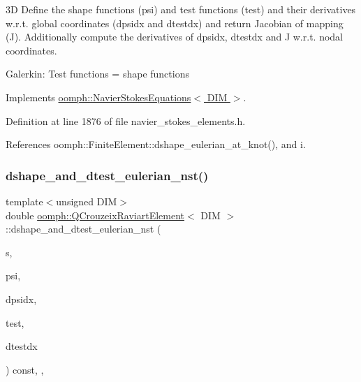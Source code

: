 3D Define the shape functions (psi) and test functions (test) and their derivatives w.\+r.\+t. global coordinates (dpsidx and dtestdx) and return Jacobian of mapping (J). Additionally compute the derivatives of dpsidx, dtestdx and J w.\+r.\+t. nodal coordinates.

Galerkin\+: Test functions = shape functions 

Implements \hyperlink{classoomph_1_1NavierStokesEquations_afbc63afd804f5143c74b0ca1be76ef82}{oomph\+::\+Navier\+Stokes\+Equations$<$ D\+I\+M $>$}.



Definition at line 1876 of file navier\+\_\+stokes\+\_\+elements.\+h.



References oomph\+::\+Finite\+Element\+::dshape\+\_\+eulerian\+\_\+at\+\_\+knot(), and i.

\mbox{\label{classoomph_1_1QCrouzeixRaviartElement_af1553d79bb5f49fd21f695d468ea59d4}} 
\subsubsection{\texorpdfstring{dshape\+\_\+and\+\_\+dtest\+\_\+eulerian\+\_\+nst()}{dshape\_and\_dtest\_eulerian\_nst()}}
{\footnotesize\ttfamily template$<$unsigned D\+IM$>$ \\
double \hyperlink{classoomph_1_1QCrouzeixRaviartElement}{oomph\+::\+Q\+Crouzeix\+Raviart\+Element}$<$ D\+IM $>$\+::dshape\+\_\+and\+\_\+dtest\+\_\+eulerian\+\_\+nst (\begin{DoxyParamCaption}\item[{const \hyperlink{classoomph_1_1Vector}{Vector}$<$ double $>$ \&}]{s,  }\item[{\hyperlink{classoomph_1_1Shape}{Shape} \&}]{psi,  }\item[{\hyperlink{classoomph_1_1DShape}{D\+Shape} \&}]{dpsidx,  }\item[{\hyperlink{classoomph_1_1Shape}{Shape} \&}]{test,  }\item[{\hyperlink{classoomph_1_1DShape}{D\+Shape} \&}]{dtestdx }\end{DoxyParamCaption}) const\hspace{0.3cm}{\ttfamily [inline]}, {\ttfamily [protected]}, {\ttfamily [virtual]}}



